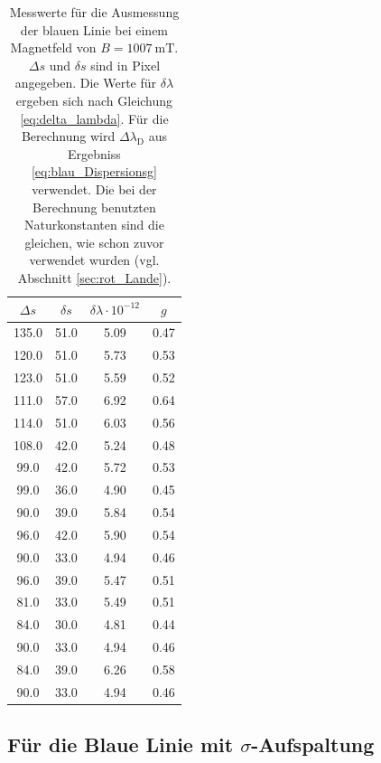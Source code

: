 \begin{table}
  \centering
  \caption{Messwerte für die Ausmessung der blauen Linie bei einem Magnetfeld von
  $B = \SI{1007}{\milli\tesla}$. $\Delta s$ und $\delta s$ sind in Pixel angegeben.
  Die Werte für $\delta\lambda$ ergeben sich nach Gleichung \ref{eq:delta_lambda}.
  Für die Berechnung wird $\Delta \lambda_\text{D}$ aus Ergebniss \ref{eq:blau_Dispersionsg}
  verwendet. Die bei der Berechnung benutzten Naturkonstanten sind die gleichen, wie
  schon zuvor verwendet wurden (vgl. Abschnitt \ref{sec:rot_Lande}).}
  \label{tab:blaupi}
  \begin{tabular}{c | c | c | c}
    \toprule
    $\Delta s$ & $\delta s$ & $\delta \lambda \cdot 10^{-12}$ & $g$\\
    \midrule
    135.0 & 51.0 & 5.09 & 0.47 \\
    120.0 & 51.0 & 5.73 & 0.53 \\
    123.0 & 51.0 & 5.59 & 0.52 \\
    111.0 & 57.0 & 6.92 & 0.64 \\
    114.0 & 51.0 & 6.03 & 0.56 \\
    108.0 & 42.0 & 5.24 & 0.48 \\
     99.0 & 42.0 & 5.72 & 0.53 \\
     99.0 & 36.0 & 4.90 & 0.45 \\
     90.0 & 39.0 & 5.84 & 0.54 \\
     96.0 & 42.0 & 5.90 & 0.54 \\
     90.0 & 33.0 & 4.94 & 0.46 \\
     96.0 & 39.0 & 5.47 & 0.51 \\
     81.0 & 33.0 & 5.49 & 0.51 \\
     84.0 & 30.0 & 4.81 & 0.44 \\
     90.0 & 33.0 & 4.94 & 0.46 \\
     84.0 & 39.0 & 6.26 & 0.58 \\
     90.0 & 33.0 & 4.94 & 0.46 \\
    \bottomrule
  \end{tabular}
\end{table}

\subsection{Für die Blaue Linie mit \texorpdfstring{$\sigma$}{σ}-Aufspaltung}
\label{sec:blau_sigma_Lande}

